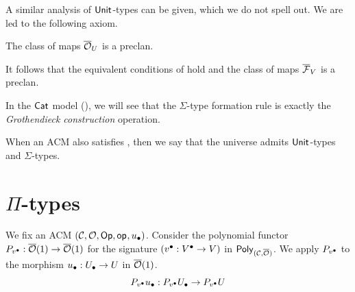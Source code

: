 A similar analysis of $\mathsf{Unit}$-types can be given,
which we do not spell out.
We are led to the following axiom.

\begin{axiom}\label{ax:small-preclan}
  The class of maps ${\overline{{\mathcal{O}}}}_U$ is a preclan.
\end{axiom}
It follows that the equivalent conditions of 
hold and the class of maps ${\overline{{\mathcal{F}}}}_V$ is a preclan.

In the $\mathsf{Cat}$ model (),
we will see that the $\Sigma$-type formation rule
is exactly the \emph{Grothendieck construction} operation.

\begin{definition}\label{def:ACM-universe-sigma}
  When an ACM also satisfies ,
  then we say that the universe admits $\mathsf{Unit}$-types and $\Sigma$-types.
\end{definition}

\section*{$\Pi$-types} 
We fix an ACM $(\mathcal{C},{\mathcal{O}},\mathop{\mathsf{Op}},\mathop{\mathsf{op}_{}} ,{u_\bullet})$.
Consider the polynomial functor $P_{v^\bullet} : {\overline{{\mathcal{O}}}}(1) \to {\overline{{\mathcal{O}}}}(1)$
for the signature $({v^\bullet} : {V^\bullet} \to V)$
in $\mathsf{Poly}_{(\mathcal{C},{\overline{{\mathcal{O}}}})}$.
We apply $P_{v^\bullet}$ to the morphism ${u_\bullet} : {U_\bullet} \to U$ in ${\overline{{\mathcal{O}}}}(1)$.
\[ P_{v^\bullet} {u_\bullet} : P_{v^\bullet} {U_\bullet} \to P_{v^\bullet} U\]

